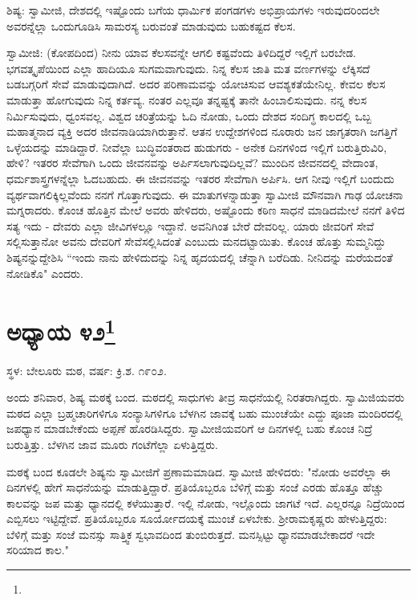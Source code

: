 ಶಿಷ್ಯ: ಸ್ವಾಮೀಜಿ, ದೇಶದಲ್ಲಿ ಇಷ್ಟೊಂದು ಬಗೆಯ ಧಾರ್ಮಿಕ ಪಂಗಡಗಳು ಅಭಿಪ್ರಾಯಗಳು ಇರುವುದರಿಂದಲೇ ಅವರನ್ನೆಲ್ಲಾ ಒಂದುಗೂಡಿಸಿ ಸಾಮರಸ್ಯ ಬರುವಂತೆ ಮಾಡುವುದು ಬಹುಕಷ್ಟದ ಕೆಲಸ.

ಸ್ವಾಮೀಜಿ: (ಕೋಪದಿಂದ) ನೀನು ಯಾವ ಕೆಲಸವನ್ನೇ ಆಗಲಿ ಕಷ್ಟವೆಂದು ತಿಳಿದಿದ್ದರೆ ಇಲ್ಲಿಗೆ ಬರಬೇಡ. ಭಗವತ್ಕೃಪೆಯಿಂದ ಎಲ್ಲಾ ಹಾದಿಯೂ ಸುಗಮವಾಗುವುದು. ನಿನ್ನ ಕೆಲಸ ಜಾತಿ ಮತ ವರ್ಣಗಳನ್ನು ಲೆಕ್ಕಿಸದೆ ಬಡಬಗ್ಗರಿಗೆ ಸೇವೆ ಮಾಡುವುದಾಗಿದೆ. ಅದರ ಪರಿಣಾಮವನ್ನು ಯೋಚಿಸುವ ಆವಶ್ಯಕತೆಯೇನಿಲ್ಲ. ಕೇವಲ ಕೆಲಸ ಮಾಡುತ್ತಾ ಹೋಗುವುದು ನಿನ್ನ ಕರ್ತವ್ಯ. ನಂತರ ಎಲ್ಲವೂ ತನ್ನಷ್ಟಕ್ಕೆ ತಾನೇ ಹಿಂಬಾಲಿಸುವುದು. ನನ್ನ ಕೆಲಸ ನಿರ್ಮಿಸುವುದು, ಧ್ವಂಸವಲ್ಲ. ವಿಶ್ವದ ಚರಿತ್ರೆಯನ್ನು ಓದಿ ನೋಡು, ಒಂದು ದೇಶದ ಸಂದಿಗ್ಧ ಕಾಲದಲ್ಲಿ ಒಬ್ಬ ಮಹಾತ್ಮನಾದ ವ್ಯಕ್ತಿ ಅದರ ಜೀವನಾಡಿಯಾಗಿರುತ್ತಾನೆ. ಆತನ ಉದ್ದೇಶಗಳಿಂದ ನೂರಾರು ಜನ ಜಾಗೃತರಾಗಿ ಜಗತ್ತಿಗೆ ಒಳ್ಳೆಯದನ್ನು ಮಾಡಿದ್ದಾರೆ. ನೀವೆಲ್ಲಾ ಬುದ್ಧಿವಂತರಾದ ಹುಡುಗರು - ಅನೇಕ ದಿನಗಳಿಂದ ಇಲ್ಲಿಗೆ ಬರುತ್ತಿರುವಿರಿ, ಹೇಳಿ? ಇತರರ ಸೇವೆಗಾಗಿ ಒಂದು ಜೀವನವನ್ನು ಅರ್ಪಿಸಲಾಗುವುದಿಲ್ಲವೆ? ಮುಂದಿನ ಜೀವನದಲ್ಲಿ ವೇದಾಂತ, ಧರ್ಮಶಾಸ್ತ್ರಗಳನ್ನೆಲ್ಲಾ ಓದಬಹುದು. ಈ ಜೀವನವನ್ನು ಇತರರ ಸೇವೆಗಾಗಿ ಅರ್ಪಿಸಿ. ಆಗ ನೀವು ಇಲ್ಲಿಗೆ ಬಂದುದು ವ್ಯರ್ಥವಾಗಲಿಕ್ಕಿಲ್ಲವೆಂದು ನನಗೆ ಗೊತ್ತಾಗುವುದು. ಈ ಮಾತುಗಳನ್ನಾಡುತ್ತಾ ಸ್ವಾಮೀಜಿ ಮೌನವಾಗಿ ಗಾಢ ಯೋಚನಾ ಮಗ್ನರಾದರು. ಕೊಂಚ ಹೊತ್ತಿನ ಮೇಲೆ ಅವರು ಹೇಳಿದರು, ಅಷ್ಟೊಂದು ಕಠಿಣ ಸಾಧನೆ ಮಾಡಿದಮೇಲೆ ನನಗೆ ತಿಳಿದ ಸತ್ಯ ಇದು - ದೇವರು ಎಲ್ಲಾ ಜೀವಿಗಳಲ್ಲೂ ಇದ್ದಾನೆ. ಅವನಿಗಿಂತ ಬೇರೆ ದೇವರಿಲ್ಲ. ಯಾರು ಜೀವರಿಗೆ ಸೇವೆ ಸಲ್ಲಿಸುತ್ತಾನೋ ಅವನು ದೇವರಿಗೆ ಸೇವೆಸಲ್ಲಿಸಿದಂತೆ ಎಂಬುದು ಮನದಟ್ಟಾಯಿತು. ಕೊಂಚ ಹೊತ್ತು ಸುಮ್ಮನಿದ್ದು ಶಿಷ್ಯನನ್ನುದ್ದೇಶಿಸಿ “ಇಂದು ನಾನು ಹೇಳಿದುದನ್ನು ನಿನ್ನ ಹೃದಯದಲ್ಲಿ ಚೆನ್ನಾಗಿ ಬರೆದಿಡು. ನೀನಿದನ್ನು ಮರೆಯದಂತೆ ನೋಡಿಕೊ" ಎಂದರು.

\newpage

\chapter[ಅಧ್ಯಾಯ ೪೨]{ಅಧ್ಯಾಯ ೪೨\protect\footnote{}}

\begin{center}
ಸ್ಥಳ: ಬೇಲೂರು ಮಠ, ವರ್ಷ: ಕ್ರಿ.ಶ. ೧೯೦೨.
\end{center}

ಅಂದು ಶನಿವಾರ, ಶಿಷ್ಯ ಮಠಕ್ಕೆ ಬಂದ. ಮಠದಲ್ಲಿ ಸಾಧುಗಳು ತೀವ್ರ ಸಾಧನೆಯಲ್ಲಿ ನಿರತರಾಗಿದ್ದರು. ಸ್ವಾಮಿಜಿಯವರು ಮಠದ ಎಲ್ಲಾ ಬ್ರಹ್ಮಚಾರಿಗಳಿಗೂ ಸಂನ್ಯಾಸಿಗಳಿಗೂ ಬೆಳಗಿನ ಜಾವಕ್ಕೆ ಬಹು ಮುಂಚೆಯೇ ಎದ್ದು ಪೂಜಾ ಮಂದಿರದಲ್ಲಿ ಜಪಧ್ಯಾನ ಮಾಡಬೇಕೆಂದು ಅಪ್ಪಣೆ ಹೊರಡಿಸಿದ್ದರು. ಸ್ವಾಮೀಜಿಯವರಿಗೆ ಆ ದಿನಗಳಲ್ಲಿ ಬಹು ಕೊಂಚ ನಿದ್ರೆ ಬರುತ್ತಿತ್ತು. ಬೆಳಗಿನ ಜಾವ ಮೂರು ಗಂಟೆಗೆಲ್ಲಾ ಏಳುತ್ತಿದ್ದರು.

ಮಠಕ್ಕೆ ಬಂದ ಕೂಡಲೇ ಶಿಷ್ಯನು ಸ್ವಾಮೀಜಿಗೆ ಪ್ರಣಾಮಮಾಡಿದ. ಸ್ವಾಮೀಜಿ ಹೇಳಿದರು: "ನೋಡು ಅವರೆಲ್ಲಾ ಈ ದಿನಗಳಲ್ಲಿ ಹೇಗೆ ಸಾಧನೆಯನ್ನು ಮಾಡುತ್ತಿದ್ದಾರೆ. ಪ್ರತಿಯೊಬ್ಬರೂ ಬೆಳಿಗ್ಗೆ ಮತ್ತು ಸಂಜೆ ಎರಡು ಹೊತ್ತೂ ಹೆಚ್ಚು ಕಾಲವನ್ನು ಜಪ ಮತ್ತು ಧ್ಯಾನದಲ್ಲಿ ಕಳೆಯುತ್ತಾರೆ. ಇಲ್ಲಿ ನೋಡು, ಇಲ್ಲೊಂದು ಜಾಗಟೆ ಇದೆ. ಎಲ್ಲರನ್ನೂ ನಿದ್ರೆಯಿಂದ ಎಬ್ಬಿಸಲು ಇಟ್ಟಿದ್ದೇವೆ. ಪ್ರತಿಯೊಬ್ಬರೂ ಸೂರ್ಯೋದಯಕ್ಕೆ ಮುಂಚೆ ಏಳಬೇಕು. ಶ‍್ರೀರಾಮಕೃಷ್ಣರು ಹೇಳುತ್ತಿದ್ದರು: ಬೆಳಿಗ್ಗೆ ಮತ್ತು ಸಂಜೆ ಮನಸ್ಸು ಸಾತ್ತ್ವಿಕ ಸ್ವಭಾವದಿಂದ ತುಂಬಿರುತ್ತದೆ. ಮನಸ್ಸಿಟ್ಟು ಧ್ಯಾನಮಾಡಬೇಕಾದರೆ ಇದೇ ಸರಿಯಾದ ಕಾಲ."

